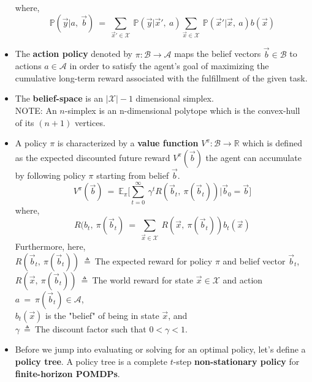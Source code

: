 \documentclass[12pt, draftcls, onecolumn]{IEEEtran}
\begin{document}
\begin{itemize}
\begin{equation}
    \end{equation}
    where,
    \begin{equation}\label{95}
        \mathbb{P}(\vec{y}|a,\ \vec{b})\ =\ \sum_{\vec{x}' \in \mathcal{X}}\ \mathbb{P}(\vec{y}|\vec{x}',\ a)\sum_{\vec{x} \in \mathcal{X}}\ \mathbb{P}(\vec{x}'|\vec{x},\ a)b(\vec{x})
    \end{equation}
    \item The \textbf{action policy} denoted by $\pi: \mathcal{B} \rightarrow \mathcal{A}$ maps the belief vectors $\vec{b} \in \mathcal{B}$ to actions $a \in \mathcal{A}$ in order to satisfy the agent's goal of maximizing the cumulative long-term reward associated with the fulfillment of the given task.
    \item The \textbf{belief-space} is an $|\mathcal{X}|-1$ dimensional simplex.
    \\NOTE: An $n$-simplex is an n-dimensional polytope which is the convex-hull of its $(n+1)$ vertices.
    \item A policy $\pi$ is characterized by a \textbf{value function} $V^{\pi}: \mathcal{B} \rightarrow \mathbb{R}$ which is defined as the expected discounted future reward $V^{\pi}(\vec{b})$ the agent can accumulate by following policy $\pi$ starting from belief $\vec{b}$.
    \begin{equation}\label{96}
        V^{\pi}(\vec{b})\ =\ \mathbb{E}_{\pi}\Big[\sum_{t=0}^{\infty}\ \gamma^t R(\vec{b}_t,\ \pi(\vec{b}_t))|\vec{b}_0=\vec{b}\Big]
    \end{equation}
    where,
    \begin{equation}\label{97}
       R(b_t,\ \pi(\vec{b}_t)\ =\ \sum_{\vec{x} \in \mathcal{X}}\ R(\vec{x},\ \pi(\vec{b}_t))b_t(\vec{x})
    \end{equation}
    Furthermore, here,
    \\$R(\vec{b}_t,\ \pi(\vec{b}_t))\ \triangleq\ $The expected reward for policy $\pi$ and belief vector $\vec{b}_t$,
    \\$R(\vec{x},\ \pi(\vec{b}_t))\ \triangleq\ $The world reward for state $\vec{x} \in \mathcal{X}$ and action $a\ =\ \pi(\vec{b}_t) \in \mathcal{A}$,
    \\$b_t(\vec{x})$ is the "belief" of being in state $\vec{x}$, and
    \\$\gamma\ \triangleq\ $The discount factor such that $0 < \gamma < 1$.
    \item Before we jump into evaluating or solving for an optimal policy, let's define a \textbf{policy tree}. A policy tree is a complete $t$-step \textbf{non-stationary policy} for \textbf{finite-horizon POMDPs}.

\end{itemize}
\end{document}
